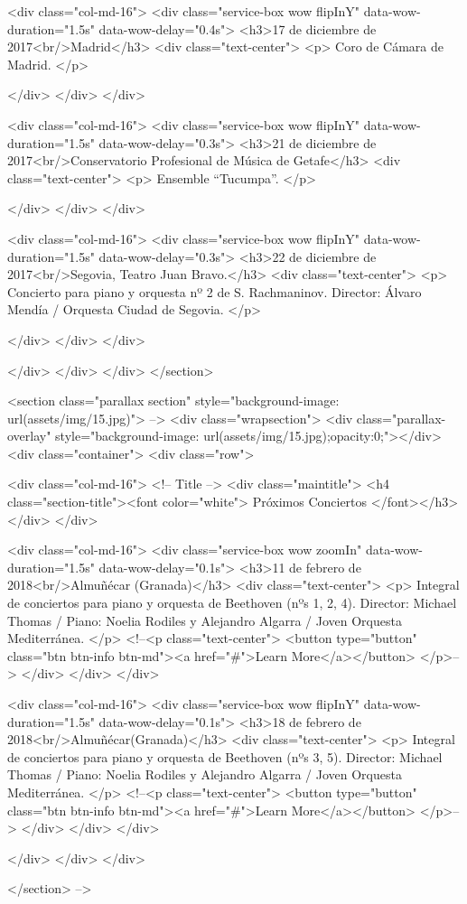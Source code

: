 			<div class="col-md-16">
				<div class="service-box wow flipInY" data-wow-duration="1.5s" data-wow-delay="0.4s">
					<h3>17 de diciembre de 2017<br/>Madrid</h3>
					<div class="text-center">
						<p>
							Coro de Cámara de Madrid.
						</p>

                    </div>
				</div>
			</div>

			<div class="col-md-16">
				<div class="service-box wow flipInY" data-wow-duration="1.5s" data-wow-delay="0.3s">
					<h3>21 de diciembre de 2017<br/>Conservatorio Profesional de Música de Getafe</h3>
					<div class="text-center">
						<p>
                            Ensemble “Tucumpa”.
						</p>

                    </div>
				</div>
			</div>

			<div class="col-md-16">
				<div class="service-box wow flipInY" data-wow-duration="1.5s" data-wow-delay="0.3s">
					<h3>22 de diciembre de 2017<br/>Segovia, Teatro Juan Bravo.</h3>
					<div class="text-center">
						<p>
							Concierto para piano y orquesta nº 2 de S. Rachmaninov. Director: Álvaro Mendía / Orquesta Ciudad de Segovia.
						</p>

                    </div>
				</div>
			</div>

		</div>
	</div>
</div>
</section>

<section class="parallax section" style="background-image: url(assets/img/15.jpg)"> -->
<div class="wrapsection">
	<div class="parallax-overlay" style="background-image: url(assets/img/15.jpg);opacity:0;"></div>
	<div class="container">
		<div class="row">

		<div class="col-md-16">
				<!-- Title -->
				<div class="maintitle">
					<h4 class="section-title"><font color="white"> Próximos Conciertos </font></h3>
				</div>
			</div>

			<div class="col-md-16">
				<div class="service-box wow zoomIn" data-wow-duration="1.5s" data-wow-delay="0.1s">
					<h3>11 de febrero de 2018<br/>Almuñécar (Granada)</h3>
					<div class="text-center">
						<p>
							Integral de conciertos para piano y orquesta de Beethoven (nºs 1, 2, 4). Director: Michael Thomas / Piano: Noelia Rodiles y Alejandro Algarra / Joven Orquesta Mediterránea.
						</p>
						<!--<p class="text-center">
							<button type="button" class="btn btn-info btn-md"><a href="#">Learn More</a></button>
						</p>-->
					</div>
				</div>
			</div>

			<div class="col-md-16">
				<div class="service-box wow flipInY" data-wow-duration="1.5s" data-wow-delay="0.1s">
					<h3>18 de febrero de 2018<br/>Almuñécar(Granada)</h3>
					<div class="text-center">
						<p>
							 Integral de conciertos para piano y orquesta de Beethoven (nºs 3, 5). Director: Michael Thomas / Piano: Noelia Rodiles y Alejandro Algarra / Joven Orquesta Mediterránea.
						</p>
						<!--<p class="text-center">
							<button type="button" class="btn btn-info btn-md"><a href="#">Learn More</a></button>
						</p>-->
                    </div>
				</div>
			</div>

		</div>
	</div>
</div>

</section> -->
